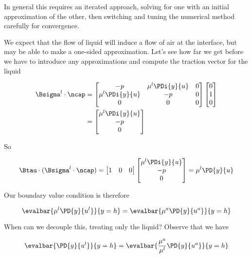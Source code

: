 In general this requires an iterated approach, solving for one with an initial approximation of the other, then switching and tuning the numerical method carefully for convergence.

We expect that the flow of liquid will induce a flow of air at the interface, but may be able to make a one-sided approximation.  Let's see how far we get before we have to introduce any approximations and compute the traction vector for the liquid

\begin{align*}
\Bsigma^l \cdot \ncap &= 
\begin{bmatrix}
-p & \mu^l \PDi{y}{u} & 0 \\
\mu^l \PDi{y}{u} & -p & 0 \\
0 & 0 & 0
\end{bmatrix}
\begin{bmatrix}
0 \\
1 \\
0
\end{bmatrix} \\
&=
\begin{bmatrix}
\mu^l \PDi{y}{u} \\
-p \\
0
\end{bmatrix}
\end{align*}

So

\begin{equation}\label{eqn:continuumL12:230}
\Btau \cdot (\Bsigma^l \cdot \ncap)
=
\begin{bmatrix}
1 & 0 & 0
\end{bmatrix}
\begin{bmatrix}
\mu^l \PDi{y}{u} \\
-p \\
0
\end{bmatrix}
=
\mu^l \PD{y}{u}
\end{equation}

Our boundary value condition is therefore

\begin{equation}\label{eqn:continuumL12:250}
\evalbar{\mu^l \PD{y}{u^l}}{y = h} =
\evalbar{\mu^a \PD{y}{u^a}}{y = h}
\end{equation}

When can we decouple this, treating only the liquid?  Observe that we have

\begin{equation}\label{eqn:continuumL12:270}
\evalbar{\PD{y}{u^l}}{y = h} =
\evalbar{\frac{\mu^a}{\mu^l} \PD{y}{u^a}}{y = h}
\end{equation}

